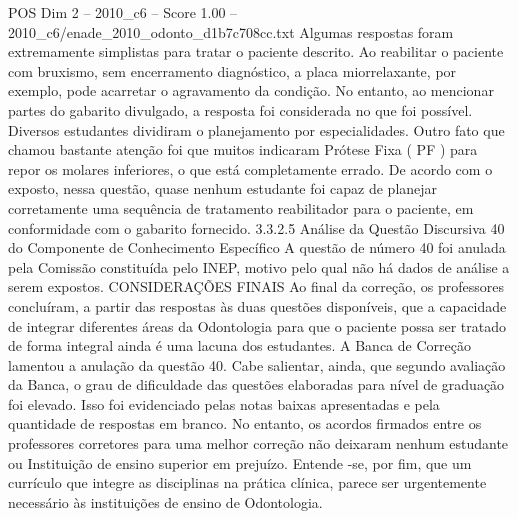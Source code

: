 \begin{textsample}{POS Dim 2 – 2010\_c6 – Score 1.00 – 2010\_c6/enade\_2010\_odonto\_d1b7c708cc.txt}
Algumas respostas foram extremamente simplistas para tratar o paciente descrito.
Ao reabilitar o paciente com bruxismo, sem encerramento diagnóstico, a placa miorrelaxante, por exemplo, pode acarretar o agravamento da condição.
No entanto, ao mencionar partes do gabarito divulgado, a resposta foi considerada no que foi possível.
Diversos estudantes dividiram o planejamento por especialidades.
Outro fato que chamou bastante atenção foi que muitos indicaram Prótese Fixa ( PF ) para repor os molares inferiores, o que está completamente errado.
De acordo com o exposto, nessa questão, quase nenhum estudante foi capaz de planejar corretamente uma sequência de tratamento reabilitador para o paciente, em conformidade com o gabarito fornecido. 3.3.2.5 Análise da Questão Discursiva 40 do Componente de Conhecimento Específico A questão de número 40 foi anulada pela Comissão constituída pelo INEP, motivo pelo qual não há dados de análise a serem expostos.
CONSIDERAÇÕES FINAIS Ao final da correção, os professores concluíram, a partir das respostas às duas questões disponíveis, que a capacidade de integrar diferentes áreas da Odontologia para que o paciente possa ser tratado de forma integral ainda é uma lacuna dos estudantes.
A Banca de Correção lamentou a anulação da questão 40.
Cabe salientar, ainda, que segundo avaliação da Banca, o grau de dificuldade das questões elaboradas para nível de graduação foi elevado.
Isso foi evidenciado pelas notas baixas apresentadas e pela quantidade de respostas em branco.
No entanto, os acordos firmados entre os professores corretores para uma melhor correção não deixaram nenhum estudante ou Instituição de ensino superior em prejuízo.
Entende -se, por fim, que um currículo que integre as disciplinas na prática clínica, parece ser urgentemente necessário às instituições de ensino de Odontologia.

\end{textsample}

